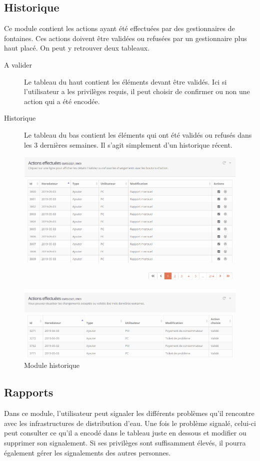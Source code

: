 \documentclass{EPL-master-thesis-covers-FR}
\begin{document}
			\subsection{Historique}
			\label{sec:historique}
				Ce module contient les actions ayant été effectuées par des gestionnaires de fontaines. Ces actions doivent être validées ou refusées par un gestionnaire plus haut placé. On peut y retrouver deux tableaux.
				\begin{description}
					\item[A valider] Le tableau du haut contient les éléments devant être validés. Ici si l'utilisateur a les privilèges requis, il peut choisir de confirmer ou non une action qui a été encodée.
					\item[Historique] Le tableau du bas contient les éléments qui ont été validés ou refusés dans les 3 dernières semaines. Il s'agit simplement d'un historique récent.
				\end{description}
				\begin{figure}[H]
					\centering
					\includegraphics[width=1\textwidth]{images/logs}
					\caption{Module historique}
				\end{figure}
			
			\subsection{Rapports}
				Dans ce module, l'utilisateur peut signaler les différents problèmes qu'il rencontre avec les infrastructures de distribution d'eau. Une fois le problème signalé, celui-ci peut consulter ce qu'il a encodé dans le tableau juste en dessous et modifier ou supprimer son signalement. Si ses privilèges sont suffisamment élevés, il pourra également gérer les signalements des autres personnes.
				
\end{document}
